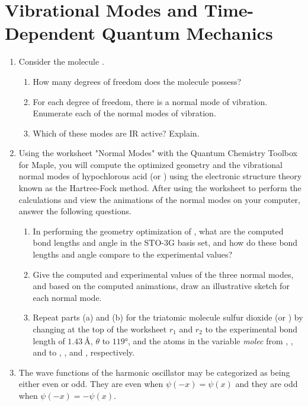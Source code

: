 \documentclass[../psets.tex]{subfiles}
\begin{document}
\section{Vibrational Modes and Time-Dependent Quantum Mechanics}
\begin{enumerate}
    \item {}Consider the molecule .
    \begin{enumerate}
        \item How many degrees of freedom does the molecule possess?
        \item For each degree of freedom, there is a normal mode of vibration. Enumerate each of the normal modes of vibration.
        \item Which of these modes are IR active? Explain.
    \end{enumerate}
    \item Using the worksheet "Normal Modes" with the Quantum Chemistry Toolbox for Maple, you will compute the optimized geometry and the vibrational normal modes of hypochlorous acid (or ) using the electronic structure theory known as the Hartree-Fock method. After using the worksheet to perform the calculations and view the animations of the normal modes on your computer, answer the following questions.
    \begin{enumerate}
        \item In performing the geometry optimization of , what are the computed bond lengths and angle in the STO-3G basis set, and how do these bond lengths and angle compare to the experimental values?
        \item Give the computed and experimental values of the three normal modes, and based on the computed animations, draw an illustrative sketch for each normal mode.
        \item Repeat parts (a) and (b) for the triatomic molecule sulfur dioxide (or ) by changing at the top of the worksheet $r_1$ and $r_2$ to the experimental bond length of $\SI{1.43}{\angstrom}$, $\theta$ to $\ang{119}$, and the atoms in the variable \emph{molec} from , , and  to , , and , respectively.
    \end{enumerate}
    \item The wave functions of the harmonic oscillator may be categorized as being either even or odd. They are even when $\psi(-x)=\psi(x)$ and they are odd when $\psi(-x)=-\psi(x)$.
    \begin{enumerate}

\end{enumerate}
\end{enumerate}
\end{document}

